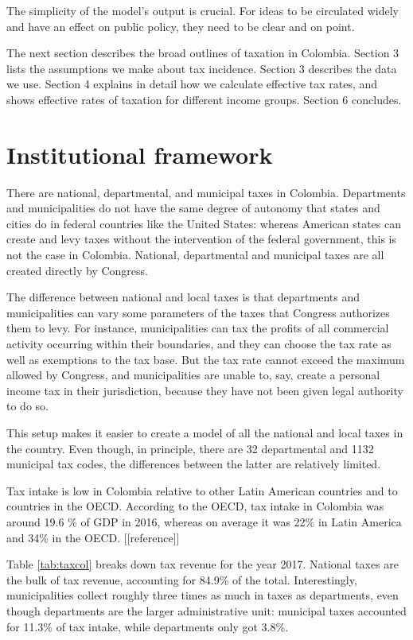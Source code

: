 \documentclass[12pt]{article}
\begin{document}
The simplicity of the model's output is crucial.
For ideas to be circulated widely and have an effect on public policy, they need to be clear and on point.

The next section describes the broad outlines of taxation in Colombia.
Section 3 lists the assumptions we make about tax incidence.
Section 3 describes the data we use.
Section 4 explains in detail how we calculate effective tax rates, and shows effective rates of taxation for different income groups.
Section 6 concludes.

\section{Institutional framework}
There are national, departmental, and municipal taxes in Colombia.
Departments and municipalities do not have the same degree of autonomy that states and cities do in federal countries like the United States: whereas American states can create and levy taxes without the intervention of the federal government, this is not the case in Colombia.
National, departmental and municipal taxes are all created directly by Congress.

The difference between national and local taxes is that departments and municipalities can vary some parameters of the taxes that Congress authorizes them to levy.
For instance, municipalities can tax the profits of all commercial activity occurring within their boundaries, and they can choose the tax rate as well as exemptions to the tax base.
But the tax rate cannot exceed the maximum allowed by Congress, and municipalities are unable to, say, create a personal income tax in their jurisdiction, because they have not been given legal authority to do so.

This setup makes it easier to create a model of all the national and local taxes in the country.
Even though, in principle, there are 32 departmental and 1132 municipal tax codes, the differences between the latter are relatively limited.

Tax intake is low in Colombia relative to other Latin American countries and to countries in the OECD.
According to the OECD, tax intake in Colombia was around 19.6 \% of GDP in 2016, whereas on average it was 22\% in Latin America and 34\% in the OECD. [[reference]]

Table \ref{tab:taxcol} breaks down tax revenue for the year 2017.
National taxes are the bulk of tax revenue, accounting for 84.9\% of the total.
Interestingly, municipalities collect roughly three times as much in taxes as departments, even though departments are the larger administrative unit: municipal taxes accounted for 11.3\% of tax intake, while departments only got 3.8\%.
\end{document}
